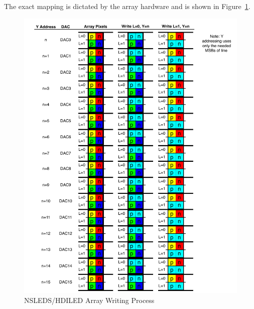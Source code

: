     The exact mapping is dictated by the array hardware and is shown in Figure~\ref{fig:nsleds_hdiled_array_interleaved_write_process}.

    \begin{figure}
        \centering
        \includegraphics[trim=0in 0.3in 0in 0in,width=1.0\textwidth]{fig/nsleds_hdiled_array_writing.pdf}
        \caption{NSLEDS/HDILED Array Writing Process}
        \label{fig:nsleds_hdiled_array_interleaved_write_process}
    \end{figure}
